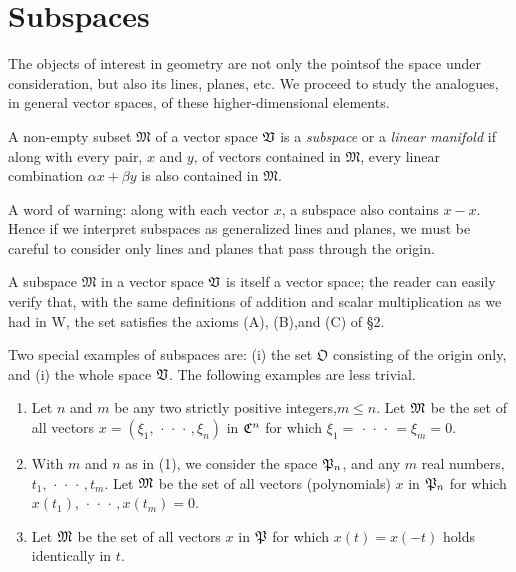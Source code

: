 \section{Subspaces}\label{sec-subspaces}

The objects of interest in geometry are not only the pointsof the space under consideration, but also its lines, planes, etc. We proceed to study the analogues, in general vector spaces, of these higher-dimensional elements.

\begin{definition}
    A non-empty subset \(\mathfrak{M}\) of a vector space \(  \mathfrak{V}\) is a \emph{subspace} or a \emph{linear manifold} if along with every pair, \(x\) and \(y\), of vectors contained in \(\mathfrak{M}\), every linear combination \(\alpha x + \beta y\) is also contained in \(\mathfrak{M}\).
\end{definition}

A word of warning: along with each vector \(x\), a subspace also contains
\(x-x\). Hence if we interpret subspaces as generalized lines and planes, we
must be careful to consider only lines and planes that pass through the origin.

A subspace \(\mathfrak{M}\) in a vector space \(\mathfrak{V}\) is itself a vector
space; the reader can easily verify that, with the same definitions of addition
and scalar multiplication as we had in W, the set satisfies the axioms (A),
(B),and (C) of §2.

Two special examples of subspaces are: (i) the set \(\mathfrak{O}\) consisting of
the origin only, and (i) the whole space \(\mathfrak{V}\). The following examples are
less trivial.

\begin{enumerate}[wide, label=(\arabic*), nosep]
    \item Let \(n\) and \(m\) be any two strictly positive integers,\(m \leq
    n\). Let \(\mathfrak{M}\) be the set of all vectors \(x = (\xi_1,
    \,\cdot\,\cdot\,\cdot\,, \xi_n)\) in \(\mathfrak{C}^n\) for which \(\xi_1 =
    \,\cdot\,\cdot\,\cdot\, = \xi_m = 0\).
    
    \item With \(m\) and \(n\) as in (1), we consider the space \(\mathfrak{P}_n\),
    and any \(m\) real numbers, \(t_1, \,\cdot\,\cdot\,\cdot\,, t_m\). Let
    \(\mathfrak{M}\) be the set of all vectors (polynomials) \(x\) in \(\mathfrak{P}_n\)
    for which \(x(t_1), \,\cdot\,\cdot\,\cdot\,, x(t_m) = 0\).
    
    \item Let \(\mathfrak{M}\) be the set of all vectors \(x\) in \(\mathfrak{P}\) for
    which \(x(t) = x(-t)\) holds identically in \(t\).
\end{enumerate}


